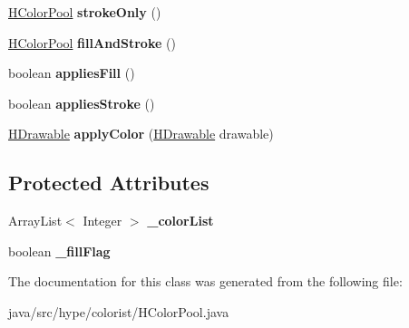 \begin{DoxyCompactItemize}
\item 
\hypertarget{classhype_1_1colorist_1_1_h_color_pool_a642aa9b2b99cb0c71eebfe358c8b8b44}{\hyperlink{classhype_1_1colorist_1_1_h_color_pool}{H\-Color\-Pool} {\bfseries stroke\-Only} ()}\label{classhype_1_1colorist_1_1_h_color_pool_a642aa9b2b99cb0c71eebfe358c8b8b44}

\item 
\hypertarget{classhype_1_1colorist_1_1_h_color_pool_aad7efb3fc0ec69eafeef4356aeb84351}{\hyperlink{classhype_1_1colorist_1_1_h_color_pool}{H\-Color\-Pool} {\bfseries fill\-And\-Stroke} ()}\label{classhype_1_1colorist_1_1_h_color_pool_aad7efb3fc0ec69eafeef4356aeb84351}

\item 
\hypertarget{classhype_1_1colorist_1_1_h_color_pool_abd17ba965c794d176b3b1c463f362679}{boolean {\bfseries applies\-Fill} ()}\label{classhype_1_1colorist_1_1_h_color_pool_abd17ba965c794d176b3b1c463f362679}

\item 
\hypertarget{classhype_1_1colorist_1_1_h_color_pool_ae982edea259c2e0d6132b000116c1201}{boolean {\bfseries applies\-Stroke} ()}\label{classhype_1_1colorist_1_1_h_color_pool_ae982edea259c2e0d6132b000116c1201}

\item 
\hypertarget{classhype_1_1colorist_1_1_h_color_pool_aed067651aacc655889e86d2776f48a49}{\hyperlink{classhype_1_1drawable_1_1_h_drawable}{H\-Drawable} {\bfseries apply\-Color} (\hyperlink{classhype_1_1drawable_1_1_h_drawable}{H\-Drawable} drawable)}\label{classhype_1_1colorist_1_1_h_color_pool_aed067651aacc655889e86d2776f48a49}

\end{DoxyCompactItemize}
\subsection*{Protected Attributes}
\begin{DoxyCompactItemize}
\item 
\hypertarget{classhype_1_1colorist_1_1_h_color_pool_ac114c69e5ac822af673061d677e6529e}{Array\-List$<$ Integer $>$ {\bfseries \-\_\-color\-List}}\label{classhype_1_1colorist_1_1_h_color_pool_ac114c69e5ac822af673061d677e6529e}

\item 
\hypertarget{classhype_1_1colorist_1_1_h_color_pool_ae79b54a80c86792f39acc720b7f63c2d}{boolean {\bfseries \-\_\-fill\-Flag}}\label{classhype_1_1colorist_1_1_h_color_pool_ae79b54a80c86792f39acc720b7f63c2d}

\end{DoxyCompactItemize}


The documentation for this class was generated from the following file\-:\begin{DoxyCompactItemize}
\item 
java/src/hype/colorist/H\-Color\-Pool.\-java\end{DoxyCompactItemize}
